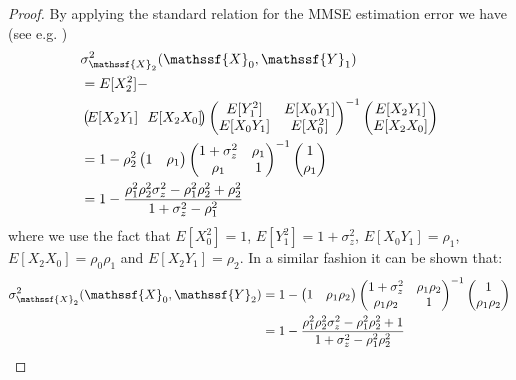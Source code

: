 \documentclass[journal, twocolumn, 10pt]{IEEEtran}
\newcommand{\rvX}{{\mathssf{X}}}    %
\newcommand{\rvY}{{\mathssf{Y}}}    %
\begin{document}
{\begin{proof}
By applying the standard relation for the MMSE estimation error we have (see e.g. \cite{willskyWornel03})
\begin{align}
&\sigma^{2}_{\rvX_2}(\rvX_0,\rvY_{1}) \notag\\
&= E[X_2^2] -\!  \notag\\ 
& \begin{pmatrix}  \! E[X_2 Y_1]\! & \!E[X_2 X_0]\! \end{pmatrix} \begin{pmatrix}
E[Y_1^2]  & E[X_0 Y_1] \\ E[X_0 Y_1] & E[X_0^2]
\end{pmatrix}^{-1} 
\begin{pmatrix}   E[X_2 Y_1] \\ E[X_2 X_0] \end{pmatrix} \\
&=1 - \rho_2^2 \begin{pmatrix}
 1 & \rho_{1} \end{pmatrix}\begin{pmatrix}
1+\sigma^2_{z} & \rho_{1} \\
 \rho_{1} &  1 \end{pmatrix}^{-1}\begin{pmatrix}
1\\
\rho_{1} \end{pmatrix}\\
&= 1- \frac{\rho_{1}^2\rho_{2}^2\sigma^{2}_{z}-\rho_{1}^2\rho_{2}^2+\rho_{2}^2}{1+\sigma^{2}_{z}-\rho^{2}_{1}}\label{eqlem11}
\end{align} 
where we use the fact that $E[X_0^2]=1$, $E[Y_1^2]=1 + \sigma_z^2$,
$E[X_0 Y_1] = \rho_1$, $E[X_2 X_0] = \rho_0 \rho_1$ and $E[X_2 Y_1]= \rho_2$. In a similar fashion it can be shown that:
\begin{align}
\sigma^{2}_{\rvX_2}(\rvX_0,\rvY_{2}) &= 1 -  \begin{pmatrix}
 1 & \rho_{1} \rho_{2} \end{pmatrix}\begin{pmatrix}
1+\sigma^2_{z} & \rho_{1}\rho_{2} \\
 \rho_{1}\rho_{2} &  1 \end{pmatrix}^{-1}\begin{pmatrix}
1\\
\rho_{1}\rho_{2} \end{pmatrix}\\
&= 1- \frac{\rho_{1}^2\rho_{2}^2\sigma^{2}_{z}-\rho_{1}^{2}\rho_{2}^2+1}{1+\sigma^{2}_{z}-\rho^{2}_{1}\rho^{2}_{2}} \label{eqlem22}

\end{align}
\end{proof}}
\end{document}
